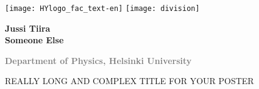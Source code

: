 \documentclass[portrait,a1]{a0poster}
\begin{document}

\begin{minipage}[t]{0.98\linewidth} %
\vspace{0pt} %


\begin{minipage}[t]{0.48\linewidth} %
\vspace{0pt} %
\texttt{[image: HYlogo\_fac\_text-en]}
\hspace{50pt}
\texttt{[image: division]}

\end{minipage} %
\begin{minipage}[t]{0.5\linewidth} %
\vspace{0pt} %

\textsf{\bfseries
Jussi Tiira \\
Someone Else
} %

\textcolor{gray}{\textsf{\bfseries{Department of Physics, Helsinki University}}}

\end{minipage}
\begin{minipage}[t]{1\linewidth}
\vspace{70pt}

\begin{spacing}{5.5}
{\Huge{}\textcolor{facultyColor}{\MakeUppercase{Really long}} \MakeUppercase{and complex title for your poster}}
\end{spacing}

\end{minipage}
\end{minipage}

\vfill %
\end{document}
